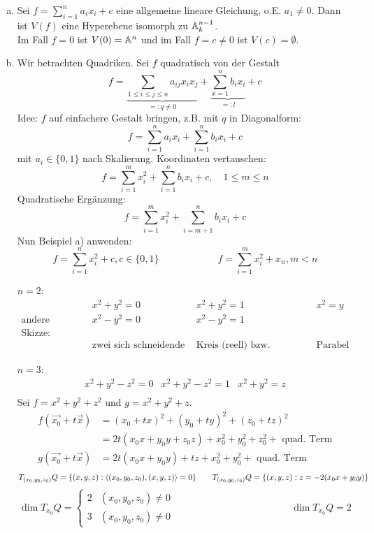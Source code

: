 \begin{bsp}
	\begin{enumerate}[a)]
		\item Sei $f = \sum_{i=1}^{n} a_ix_i + c$ eine allgemeine lineare Gleichung, o.E. $a_1 \neq 0$. Dann ist $V(f)$ eine Hyperebene isomorph zu $\mathbb{A}_k^{n-1}$. \\
		Im Fall $f=0$ ist $V(0) = \mathbb{A}^n$ und im Fall $f = c \neq 0$ ist $V(c) = \emptyset$.
		\item Wir betrachten Quadriken. Sei $f$ quadratisch von der Gestalt
		\[ f = \underbrace{\sum_{1\leq i \leq j \leq n} a_{ij} x_i x_j}_{=: q \neq 0} + \underbrace{\sum_{x=1}^{n} b_i x_i}_{=: l} + c \]
		Idee: $f$ auf einfachere Gestalt bringen, z.B. mit $q$ in Diagonalform:
		\[ f = \sum_{i=1}^{n} a_i x_i + \sum_{i=1}^{n} b_i x_i + c \]
		mit $a_i \in \{0,1\}$ nach Skalierung. Koordinaten vertauschen:
		\[ f = \sum_{i=1}^{m} x_i^2 + \sum_{i=1}^{n} b_i x_i + c, \quad 1 \leq m \leq n \]
		Quadratische Ergänzung:
		\[ f = \sum_{i=1}^{m} x_i^2 + \sum_{i=m+1}^{n} b_i x_i + c \]
		Nun Beispiel a) anwenden:
		\[ f = \sum_{i=1}^{n} x_i^2 + c, c \in \{0,1\} \qquad \qquad \qquad f = \sum_{i=1}^{m} x_i^2 + x_n, m < n \]
		
		$n=2$: 
		\[\begin{array}{rccc}
			& x^2 + y^2 = 0 & x^2+y^2 = 1 & x^2 = y \\ 
			\text{andere Varianten:} & x^2-y^2 = 0 & x^2-y^2=1 &  \\ 
			\text{Skizze:} &  &  &  \\ 
			& \text{zwei sich schneidende Geraden} &\text{Kreis (reell) bzw. Hyperbel (komplex)} & \text{Parabel}
		\end{array}\]
		
		$n = 3$: 
		\[\begin{array}{ccc}
			x^2+y^2-z^2 = 0 & x^2+y^2-z^2=1 & x^2+y^2=z \\ 
			&  &   
		\end{array} \]
		Sei $f = x^2+y^2+z^2$ und $g = x^2+y^2+z$. \\
		\begin{equation}
		\begin{aligned}
			f(\vec{x_0} + t\vec{x}) &= (x_0 + tx)^2 + (y_0 + ty)^2 + (z_0 + tz)^2 \\
			&= 2t(x_0x+y_0y+z_0z) + x_0^2 + y_0^2 + z_0^2 + \text{ quad. Term} \\
			g(\vec{x_0}+t\vec{x}) &= 2t(x_0x+y_0y)+tz+x_0^2+y_0^2+ \text{ quad. Term}
		\end{aligned}
		\end{equation}
		\[ T_{(x_0,y_0,z_0)}Q = \{ (x,y,z) : \langle(x_0,y_0,z_0),(x,y,z)\rangle = 0\} \qquad T_{(x_0,y_0,z_0)}Q = \{(x,y,z) : z = -2(x_0x + y_0y)\}\]
		\[ \dim T_{x_0}Q = \begin{cases}
			2 & (x_0,y_0,z_0) \neq 0 \\
			3 & (x_0,y_0,z_0) \neq 0
		\end{cases} \hspace{5cm}  \dim T_{x_0}Q = 2 \]
	\end{enumerate}
\end{bsp}
	
